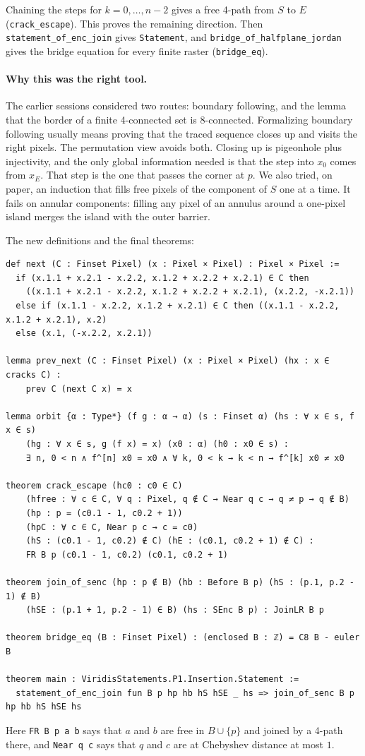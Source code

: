 \documentclass[11pt]{article}
\theoremstyle{definition}
\theoremstyle{remark}
\begin{document}
Chaining the steps for $k=0,\dots,n-2$ gives a free 4-path from $S$ to $E$
(\texttt{crack\_escape}). This proves the remaining direction. Then
\texttt{statement\_of\_enc\_join} gives \texttt{Statement}, and
\texttt{bridge\_of\_halfplane\_jordan} gives the bridge equation for every finite raster
(\texttt{bridge\_eq}).

\paragraph{Why this was the right tool.} The earlier sessions considered two
routes: boundary following, and the lemma that the border of a finite 4-connected set
is 8-connected. Formalizing boundary following usually means proving that the traced
sequence closes up and visits the right pixels. The permutation view avoids both. Closing
up is pigeonhole plus injectivity, and the only global information needed is that the
step into $x_0$ comes from $x_E$. That step is the one that passes the corner at $p$. We
also tried, on paper, an induction that fills free pixels of the component of $S$ one
at a time. It fails on annular components: filling any pixel of an annulus around a
one-pixel island merges the island with the outer barrier.

The new definitions and the final theorems:
\begin{lstlisting}
def next (C : Finset Pixel) (x : Pixel × Pixel) : Pixel × Pixel :=
  if (x.1.1 + x.2.1 - x.2.2, x.1.2 + x.2.2 + x.2.1) ∈ C then
    ((x.1.1 + x.2.1 - x.2.2, x.1.2 + x.2.2 + x.2.1), (x.2.2, -x.2.1))
  else if (x.1.1 - x.2.2, x.1.2 + x.2.1) ∈ C then ((x.1.1 - x.2.2, x.1.2 + x.2.1), x.2)
  else (x.1, (-x.2.2, x.2.1))

lemma prev_next (C : Finset Pixel) (x : Pixel × Pixel) (hx : x ∈ cracks C) :
    prev C (next C x) = x

lemma orbit {α : Type*} (f g : α → α) (s : Finset α) (hs : ∀ x ∈ s, f x ∈ s)
    (hg : ∀ x ∈ s, g (f x) = x) (x0 : α) (h0 : x0 ∈ s) :
    ∃ n, 0 < n ∧ f^[n] x0 = x0 ∧ ∀ k, 0 < k → k < n → f^[k] x0 ≠ x0

theorem crack_escape (hc0 : c0 ∈ C)
    (hfree : ∀ c ∈ C, ∀ q : Pixel, q ∉ C → Near q c → q ≠ p → q ∉ B)
    (hp : p = (c0.1 - 1, c0.2 + 1))
    (hpC : ∀ c ∈ C, Near p c → c = c0)
    (hS : (c0.1 - 1, c0.2) ∉ C) (hE : (c0.1, c0.2 + 1) ∉ C) :
    FR B p (c0.1 - 1, c0.2) (c0.1, c0.2 + 1)

theorem join_of_senc (hp : p ∉ B) (hb : Before B p) (hS : (p.1, p.2 - 1) ∉ B)
    (hSE : (p.1 + 1, p.2 - 1) ∈ B) (hs : SEnc B p) : JoinLR B p

theorem bridge_eq (B : Finset Pixel) : (enclosed B : ℤ) = C8 B - euler B

theorem main : ViridisStatements.P1.Insertion.Statement :=
  statement_of_enc_join fun B p hp hb hS hSE _ hs => join_of_senc B p hp hb hS hSE hs
\end{lstlisting}
Here \texttt{FR B p a b} says that $a$ and $b$ are free in $B\cup\{p\}$ and joined by a
4-path there, and \texttt{Near q c} says that $q$ and $c$ are at Chebyshev distance at most $1$.
\end{document}
